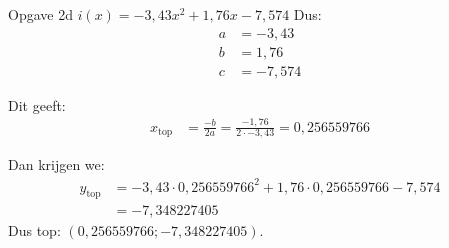 \begin{frame}
\begin{block}{Opgave 2d}
$i(x) = -3,43x^2 +1,76x - 7,574$
Dus:
\begin{align*}
 a &= -3,43\\
 b &= 1,76 \\
 c &= -7,574
\end{align*}

Dit geeft:
\begin{align*}
 x_{\text{top}} &= \frac{-b}{2a} = \frac{- 1,76 }{2 \cdot -3,43} = 0,256559766
 \end{align*}

Dan krijgen we:
\begin{align*}
 y_{\text{top}} &= -3,43 \cdot 0,256559766^2 + 1,76 \cdot 0,256559766 - 7,574 \\&= -7,348227405
 \end{align*}
Dus top: $(0,256559766;-7,348227405)$.
\end{block}
\end{frame}
